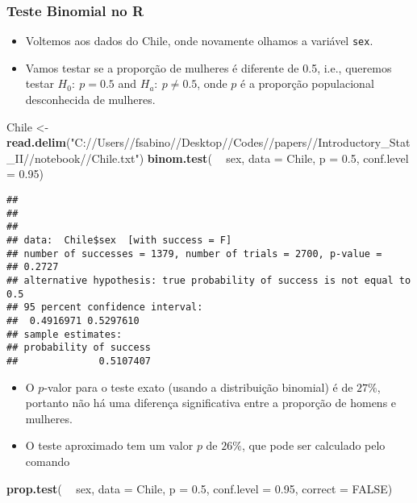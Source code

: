 \documentclass[]{article}
\newenvironment{Shaded}{\begin{snugshade}}{\end{snugshade}}
\newcommand{\KeywordTok}[1]{\textcolor[rgb]{0.13,0.29,0.53}{\textbf{#1}}}
\newcommand{\DataTypeTok}[1]{\textcolor[rgb]{0.13,0.29,0.53}{#1}}
\newcommand{\FloatTok}[1]{\textcolor[rgb]{0.00,0.00,0.81}{#1}}
\newcommand{\StringTok}[1]{\textcolor[rgb]{0.31,0.60,0.02}{#1}}
\newcommand{\OtherTok}[1]{\textcolor[rgb]{0.56,0.35,0.01}{#1}}
\newcommand{\OperatorTok}[1]{\textcolor[rgb]{0.81,0.36,0.00}{\textbf{#1}}}
\newcommand{\NormalTok}[1]{#1}
\providecommand{\tightlist}{%
  \setlength{\itemsep}{0pt}\setlength{\parskip}{0pt}}
\begin{document}
\subsubsection{\texorpdfstring{Teste Binomial no
\textbf{R}}{Teste Binomial no R}}\label{teste-binomial-no-r}

\begin{itemize}
\tightlist
\item
  Voltemos aos dados do Chile, onde novamente olhamos a variável
  \texttt{sex}.
\item
  Vamos testar se a proporção de mulheres é diferente de 0.5, i.e.,
  queremos testar \(H_0:\ p=0.5\) and \(H_a:\ p \neq 0.5\), onde \(p\) é
  a proporção populacional desconhecida de mulheres.
\end{itemize}

\begin{Shaded}
\begin{Highlighting}[]
\NormalTok{Chile <-}\StringTok{ }\KeywordTok{read.delim}\NormalTok{(}\StringTok{"C://Users//fsabino//Desktop//Codes//papers//Introductory_Stat_II//notebook//Chile.txt"}\NormalTok{)}
\KeywordTok{binom.test}\NormalTok{( }\OperatorTok{~}\StringTok{ }\NormalTok{sex, }\DataTypeTok{data =}\NormalTok{ Chile, }\DataTypeTok{p =} \FloatTok{0.5}\NormalTok{, }\DataTypeTok{conf.level =} \FloatTok{0.95}\NormalTok{)}
\end{Highlighting}
\end{Shaded}

\begin{verbatim}
## 
## 
## 
## data:  Chile$sex  [with success = F]
## number of successes = 1379, number of trials = 2700, p-value =
## 0.2727
## alternative hypothesis: true probability of success is not equal to 0.5
## 95 percent confidence interval:
##  0.4916971 0.5297610
## sample estimates:
## probability of success 
##              0.5107407
\end{verbatim}

\begin{itemize}
\tightlist
\item
  O \(p\)-valor para o teste exato (usando a distribuição binomial) é de
  \(27\%\), portanto não há uma diferença significativa entre a
  proporção de homens e mulheres.
\item
  O teste aproximado tem um valor \(p\) de \(26\%\), que pode ser
  calculado pelo comando
\end{itemize}

\begin{Shaded}
\begin{Highlighting}[]
\KeywordTok{prop.test}\NormalTok{( }\OperatorTok{~}\StringTok{ }\NormalTok{sex, }\DataTypeTok{data =}\NormalTok{ Chile, }\DataTypeTok{p =} \FloatTok{0.5}\NormalTok{, }\DataTypeTok{conf.level =} \FloatTok{0.95}\NormalTok{, }\DataTypeTok{correct =} \OtherTok{FALSE}\NormalTok{)}
\end{Highlighting}
\end{Shaded}
\end{document}
